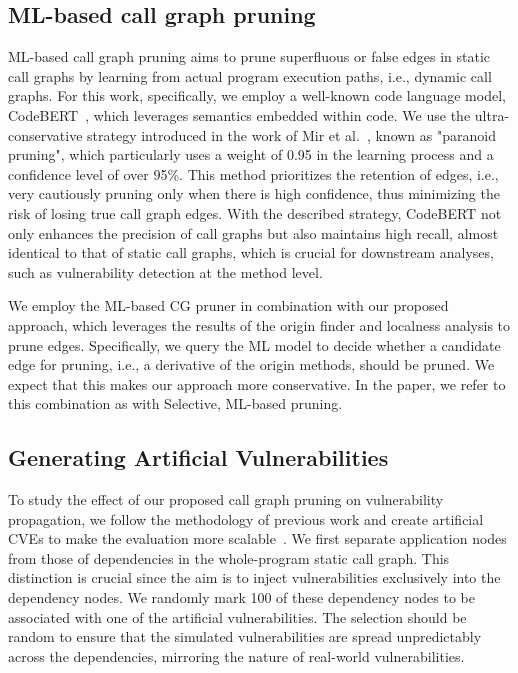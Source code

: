 \subsection{ML-based call graph pruning}
ML-based call graph pruning aims to prune superfluous or false edges in static call graphs by learning from actual program execution paths, i.e., dynamic call graphs. For this work, specifically, we employ a well-known code language model, CodeBERT~\cite{feng2020codebert}, which leverages semantics embedded within code. We use the ultra-conservative strategy introduced in the work of Mir et al.~\cite{mir2023effect}, known as "paranoid pruning", which particularly uses a weight of 0.95 in the learning process and a confidence level of over 95\%. This method prioritizes the retention of edges, i.e., very cautiously pruning only when there is high confidence, thus minimizing the risk of losing true call graph edges. With the described strategy, CodeBERT not only enhances the precision of call graphs but also maintains high recall, almost identical to that of static call graphs, which is crucial for downstream analyses, such as vulnerability detection at the method level.

We employ the ML-based CG pruner in combination with our proposed approach, which leverages the results of the origin finder and localness analysis to prune edges. Specifically, we query the ML model to decide whether a candidate edge for pruning, i.e., a 
derivative of the origin methods, should be pruned. We expect that this makes our approach more conservative. In the paper, we refer to this combination as  with Selective, ML-based pruning.

\subsection{Generating Artificial Vulnerabilities}
To study the effect of our proposed call graph pruning on vulnerability propagation, we follow the methodology of previous work and create artificial CVEs to make the evaluation more scalable~\cite{mir2023effect}. We first separate application nodes from those of dependencies in the whole-program static call graph. This distinction is crucial since the aim is to inject vulnerabilities exclusively into the dependency nodes. We randomly mark 100 of these dependency nodes to be associated with one of the artificial vulnerabilities. The selection should be random to ensure that the simulated vulnerabilities are spread unpredictably across the dependencies, mirroring the nature of real-world vulnerabilities.

